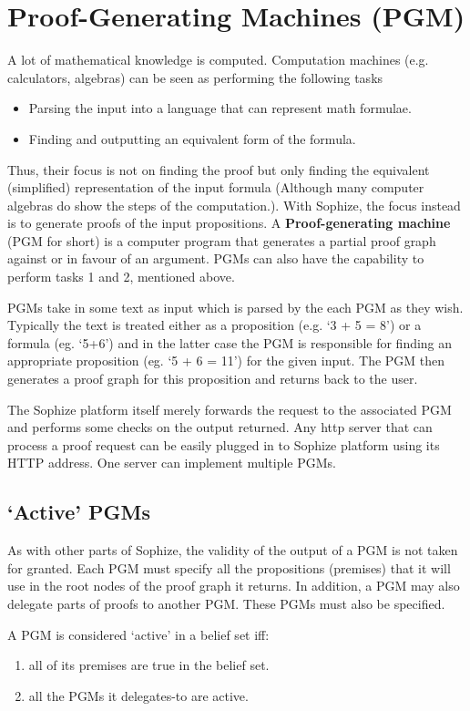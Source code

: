 \documentclass[runningheads]{llncs}
\begin{document}
\section{Proof-Generating Machines (PGM)}
\label{sec:pgm}
A lot of mathematical knowledge is computed. Computation machines (e.g. calculators, algebras) can be seen as performing the following tasks
\begin{itemize}
\item Parsing the input into a language that can represent math formulae. 
\item Finding and outputting an equivalent form of the formula.
\end{itemize}
Thus, their focus is not on finding the proof but only finding the equivalent (simplified) representation of the input formula (Although many computer algebras do show the steps of the computation.). With Sophize, the focus instead is to generate proofs of the input propositions. A \textbf{Proof-generating machine} (PGM for short) is a computer program that generates a partial proof graph against or in favour of an argument. PGMs can also have the capability to perform tasks 1 and 2, mentioned above.

PGMs take in some text as input which is parsed by the each PGM as they wish. Typically the text is treated either as a proposition (e.g. `3 + 5 = 8') or a formula (eg. `5+6') and in the latter case the PGM is responsible for finding an appropriate proposition (eg. `5 + 6 = 11') for the given input. The PGM then generates a proof graph for this proposition and returns back to the user.

The Sophize platform itself merely forwards the request to the associated PGM and performs some checks on the output returned. Any http server that can process a proof request can be easily plugged in to Sophize platform using its HTTP address. One server can implement multiple PGMs.

\subsection{`Active' PGMs}
As with other parts of Sophize, the validity of the output of a PGM is not taken for granted. Each PGM must specify all the propositions (premises) that it will use in the root nodes of the proof graph it returns. In addition, a PGM may also delegate parts of proofs to another PGM. These PGMs must also be specified. 

A PGM is considered `active' in a belief set iff:
\begin{enumerate}
\item all of its premises are true in the belief set.
\item all the PGMs it delegates-to are active.
\end{enumerate}
\end{document}
